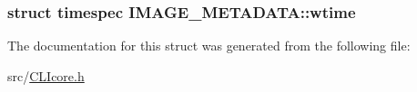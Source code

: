 \hypertarget{structIMAGE__METADATA_a5a4dfe37e26ea28f88f85df4dde00600}{
\subsubsection[{wtime}]{\setlength{\rightskip}{0pt plus 5cm}struct timespec I\+M\+A\+G\+E\+\_\+\+M\+E\+T\+A\+D\+A\+T\+A\+::wtime}}\label{structIMAGE__METADATA_a5a4dfe37e26ea28f88f85df4dde00600}


The documentation for this struct was generated from the following file\+:\begin{DoxyCompactItemize}
\item 
src/\hyperlink{CLIcore_8h}{C\+L\+Icore.\+h}\end{DoxyCompactItemize}

